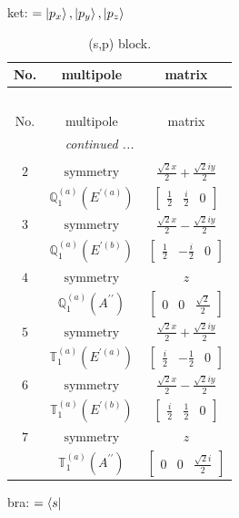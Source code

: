 \documentclass[fleqn,8pt,landscape]{jsarticle}
\begin{document}
\noindent
ket: $=\ket{p_{x}}, \ket{p_{y}}, \ket{p_{z}}$
\renewcommand{\arraystretch}{1.6}
\begin{longtable}{ccc}
\caption{(s,p) block.}
 \\
 \hline \hline
No. & multipole & matrix \\ \hline \endfirsthead

\multicolumn{2}{l}{\tablename\ \thetable{}} \\
 \hline \hline
No. & multipole & matrix \\ \hline \endhead

 \hline \hline
\multicolumn{2}{r}{\footnotesize\it continued ...} \\ \endfoot

 \hline \hline
\multicolumn{2}{r}{} \\ \endlastfoot

$ 2 $ & $ \text{symmetry} $ & $ \frac{\sqrt{2} x}{2} + \frac{\sqrt{2} i y}{2} $ \\
$  $ & $ \mathbb{Q}_{1}^{(a)}(E^{\prime(a)}) $ & $ \begin{bmatrix} \frac{1}{2} & \frac{i}{2} & 0 \end{bmatrix} $ \\ \hline
$ 3 $ & $ \text{symmetry} $ & $ \frac{\sqrt{2} x}{2} - \frac{\sqrt{2} i y}{2} $ \\
$  $ & $ \mathbb{Q}_{1}^{(a)}(E^{\prime(b)}) $ & $ \begin{bmatrix} \frac{1}{2} & - \frac{i}{2} & 0 \end{bmatrix} $ \\ \hline
$ 4 $ & $ \text{symmetry} $ & $ z $ \\
$  $ & $ \mathbb{Q}_{1}^{(a)}(A^{\prime\prime}) $ & $ \begin{bmatrix} 0 & 0 & \frac{\sqrt{2}}{2} \end{bmatrix} $ \\ \hline
$ 5 $ & $ \text{symmetry} $ & $ \frac{\sqrt{2} x}{2} + \frac{\sqrt{2} i y}{2} $ \\
$  $ & $ \mathbb{T}_{1}^{(a)}(E^{\prime(a)}) $ & $ \begin{bmatrix} \frac{i}{2} & - \frac{1}{2} & 0 \end{bmatrix} $ \\ \hline
$ 6 $ & $ \text{symmetry} $ & $ \frac{\sqrt{2} x}{2} - \frac{\sqrt{2} i y}{2} $ \\
$  $ & $ \mathbb{T}_{1}^{(a)}(E^{\prime(b)}) $ & $ \begin{bmatrix} \frac{i}{2} & \frac{1}{2} & 0 \end{bmatrix} $ \\ \hline
$ 7 $ & $ \text{symmetry} $ & $ z $ \\
$  $ & $ \mathbb{T}_{1}^{(a)}(A^{\prime\prime}) $ & $ \begin{bmatrix} 0 & 0 & \frac{\sqrt{2} i}{2} \end{bmatrix} $ \\ \hline
\end{longtable}
bra: $=\bra{s}$
\end{document}

